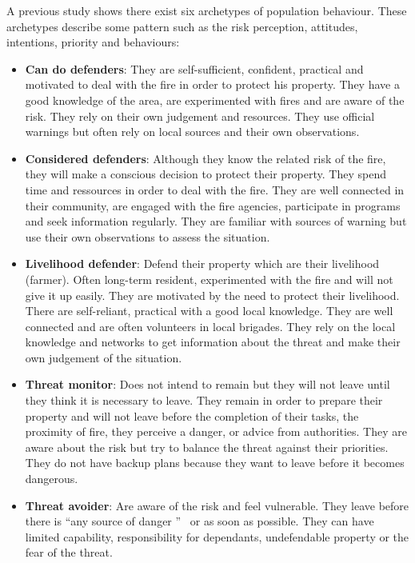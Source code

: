 \documentclass[12pt, a4paper]{memoir} %
\begin{document}
		A previous study shows there exist six archetypes of population behaviour. These archetypes describe some
		pattern such as the risk perception, attitudes, intentions, priority and behaviours\cite{rhodes2014, adam2015}:
		\begin{itemize}
			\item \textbf{Can do defenders}: They are self-sufficient, confident, practical and motivated to deal with the fire in order to protect
			his property. They have a good knowledge of the area, are experimented with fires and are aware of the risk. They rely on
			their own judgement and resources. They use official warnings but often rely on local sources and their own observations.
			\item \textbf{Considered defenders}: Although they know the related risk of the fire, they will make a conscious decision to protect
			their property. They spend time and ressources in order to deal with the fire. They are well connected in their community, are engaged
			with the fire agencies, participate in programs and seek information regularly. They are familiar with sources of warning but use their
			own observations to assess the situation.
			\item \textbf{Livelihood defender}: Defend their property which are their livelihood (farmer). Often long-term resident, experimented
			with the fire and will not give it up easily. They are motivated by the need to protect their livelihood. There are self-reliant, practical
			with a good local knowledge. They are well connected and are often volunteers in local brigades. They rely on the local knowledge and networks to
			get information about the threat and make their own judgement of the situation.
			\item \textbf{Threat monitor}: Does not intend to remain but they will not leave until they think it is necessary to leave. They remain
			in order to prepare their property and will not leave before the completion of their tasks, the proximity of fire, they perceive a danger,
			or advice from authorities. They are aware about the risk but try to balance the threat against their priorities. They do not have backup
			plans because they want to leave before it becomes dangerous.
			\item \textbf{Threat avoider}: Are aware of the risk and feel vulnerable. They leave before there is \textquotedblleft any source of danger \textquotedblright
			~or as soon as possible. They can have limited capability, responsibility for dependants, undefendable property or the fear of the threat.

\end{itemize}
\end{document}
